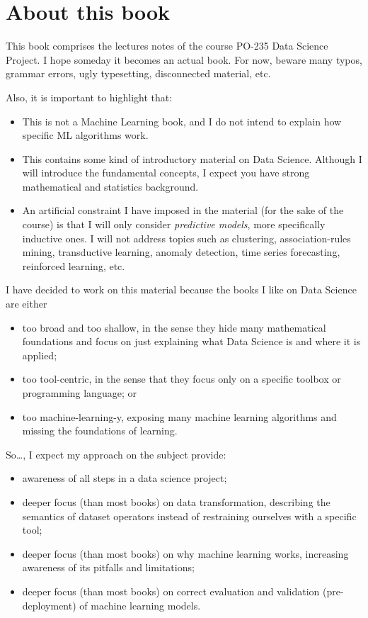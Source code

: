 \chapter*{About this book}

This book comprises the lectures notes of the course PO-235 Data Science Project.
I hope someday it becomes an actual book. For now, beware many typos, grammar errors, ugly
typesetting, disconnected material, etc.

Also, it is important to highlight that:
\begin{itemize}
  \item This is not a Machine Learning book, and I do not intend to explain how specific
    ML algorithms work.
  \item This contains some kind of introductory material on Data Science.  Although I will
    introduce the fundamental concepts, I expect you have strong mathematical and
    statistics background.
  \item An artificial constraint I have imposed in the material (for the sake of the
    course) is that I will only consider \emph{predictive models}, more specifically
    inductive ones. I will not address topics such as clustering, association-rules
    mining, transductive learning, anomaly detection, time series forecasting, reinforced
    learning, etc.
\end{itemize}

I have decided to work on this material because the books I like on Data Science are
either
\begin{itemize}
  \item too broad and too shallow, in the sense they hide many mathematical foundations
    and focus on just explaining what Data Science is and where it is applied;
  \item too tool-centric, in the sense that they focus only on a specific toolbox or
    programming language; or
  \item too machine-learning-y, exposing many machine learning algorithms and missing the
    foundations of learning.
\end{itemize}

So\dots, I expect my approach on the subject provide:
\begin{itemize}
  \item awareness of all steps in a data science project;
  \item deeper focus (than most books) on data transformation, describing the semantics of dataset
    operators instead of restraining ourselves with a specific tool;
  \item deeper focus (than most books) on why machine learning works, increasing awareness of its pitfalls and
    limitations;
  \item deeper focus (than most books) on correct evaluation and validation
    (pre-deployment) of machine learning models.
\end{itemize}

